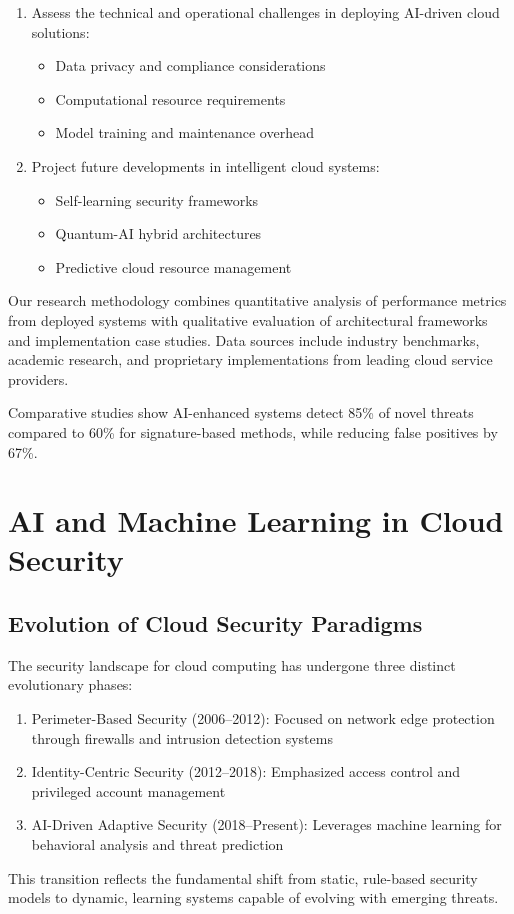 \documentclass[a4paper,12pt]{article}
\begin{document}
\begin{enumerate}
    \item Assess the technical and operational challenges in deploying AI-driven cloud solutions:
          \begin{itemize}
              \item Data privacy and compliance considerations
              \item Computational resource requirements
              \item Model training and maintenance overhead
          \end{itemize}
    \item Project future developments in intelligent cloud systems:
          \begin{itemize}
              \item Self-learning security frameworks
              \item Quantum-AI hybrid architectures
              \item Predictive cloud resource management
          \end{itemize}
\end{enumerate}

Our research methodology combines quantitative analysis of performance metrics from deployed systems with qualitative evaluation of architectural frameworks and implementation case studies. Data sources include industry benchmarks, academic research, and proprietary implementations from leading cloud service providers.

Comparative studies show AI-enhanced systems detect 85\% of novel threats compared to 60\% for signature-based methods, while reducing false positives by 67\%.

\section{AI and Machine Learning in Cloud Security}
\subsection{Evolution of Cloud Security Paradigms}
The security landscape for cloud computing has undergone three distinct evolutionary phases:
\begin{enumerate}
    \item Perimeter-Based Security (2006--2012): Focused on network edge protection through firewalls and intrusion detection systems
    \item Identity-Centric Security (2012--2018): Emphasized access control and privileged account management
    \item AI-Driven Adaptive Security (2018--Present): Leverages machine learning for behavioral analysis and threat prediction
\end{enumerate}
This transition reflects the fundamental shift from static, rule-based security models to dynamic, learning systems capable of evolving with emerging threats.
\end{document}
